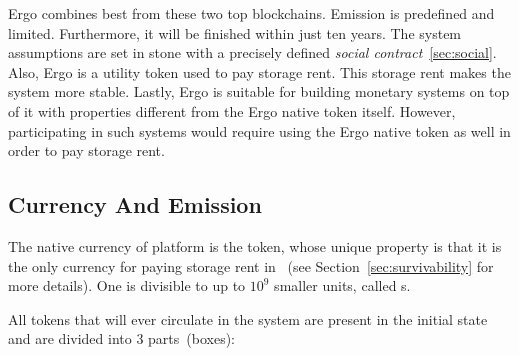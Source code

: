  Ergo combines best from these two top blockchains. Emission is predefined and limited. Furthermore, it will be finished within
 just ten years. The system assumptions are set in stone with a precisely defined {\em social contract}~\ref{sec:social}. Also,
 Ergo is a utility token used to pay storage rent. This storage rent makes the system more stable. Lastly, Ergo is suitable for building monetary systems on top of it with properties different from the Ergo native token itself. However, participating in such systems would require using the Ergo native token as well in order to pay storage rent.


\subsection{Currency And Emission}
\label{sec:currency}

The native currency of \Ergo{} platform is the \Erg{} token, whose unique property is
that it is the only currency for paying storage rent in \Ergo{}~(see Section~\ref{sec:survivability} for more details).
One \Erg{} is divisible to up to $10^9$ smaller units, called \nanoErg{}s.

All \Erg{} tokens that will ever circulate in the system are present in
the initial state and are divided into 3 parts~(boxes):


